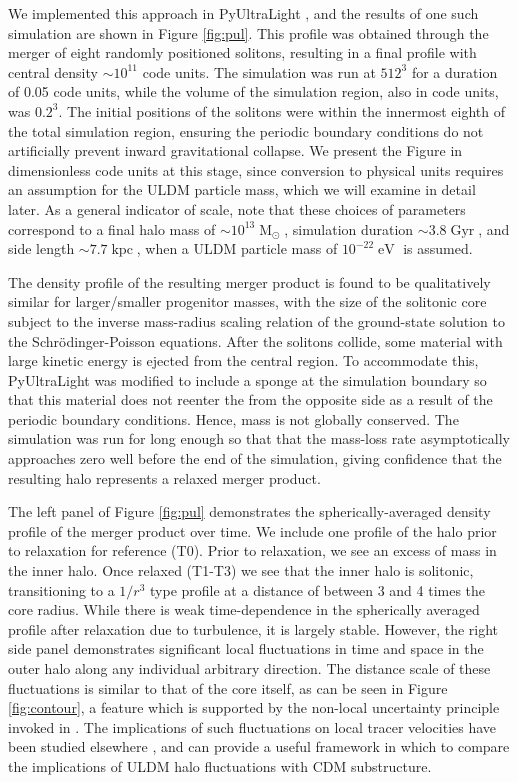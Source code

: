 \documentclass[a4paper,11pt]{article}
\begin{document}
We  implemented this approach in {\sc PyUltraLight} \cite{Edwards:2018ccc}, and the results of one such simulation are shown in Figure \ref{fig:pul}. This profile was obtained through the merger of eight randomly positioned solitons, resulting in a final profile with central density $\sim 10^{11}$ code units.
The simulation was run at $512^3$ for a duration of 0.05 code units, while the volume of the simulation region, also in code units, was $0.2^3$. The initial positions of the solitons were within the innermost eighth of the total simulation region, ensuring the periodic boundary conditions do not artificially prevent inward gravitational collapse. We present the Figure in dimensionless code units at this stage, since conversion to physical units requires an assumption for the ULDM particle mass, which we will examine in detail later. As a general indicator of scale, note that these choices of parameters correspond to a final halo mass of $\sim 10^{13}\operatorname{M}_{\odot}$, simulation duration $\sim 3.8 \operatorname{Gyr}$, and side length $\sim 7.7 \operatorname{kpc}$, when a ULDM particle mass of $10^{-22}\operatorname{eV}$ is assumed.

The density profile of the resulting merger product is found to be qualitatively similar for larger/smaller progenitor masses, with the size of the solitonic core subject to the inverse mass-radius scaling relation of the ground-state solution to the Schr{\"o}dinger-Poisson equations. After the solitons collide, some material with large kinetic energy is ejected from the central region. To accommodate this, {\sc PyUltraLight} was modified to include a sponge at the simulation boundary so that this material does not reenter the from the opposite side as a result of the periodic boundary conditions. Hence, mass is not globally conserved. The simulation was run for long enough so that that the mass-loss rate asymptotically approaches zero well before the end of the simulation, giving confidence that the resulting halo represents a relaxed merger product. 

The left panel of Figure \ref{fig:pul} demonstrates the spherically-averaged density profile of the merger product over time. We include one profile of the halo prior to relaxation for reference (T0). Prior to relaxation, we see an excess of mass in the inner halo. Once relaxed (T1-T3) we see that the inner halo is solitonic, transitioning to a $1/r^3$ type profile at a distance of between 3 and 4 times the core radius. While there is weak time-dependence in the spherically averaged profile after relaxation due to turbulence, it is largely stable. However, the right side panel demonstrates significant local fluctuations in time and space in the outer halo along any individual arbitrary direction. The distance scale of these fluctuations is similar to that of the core itself, as can be seen in Figure \ref{fig:contour}, a feature which is supported by the non-local uncertainty principle invoked in \cite{Schive:2014hza}. The implications of such fluctuations on local tracer velocities have been studied elsewhere \cite{Marsh:2018zyw}, and can provide a useful framework in which to compare the implications of ULDM halo fluctuations with CDM substructure. 
\end{document}
